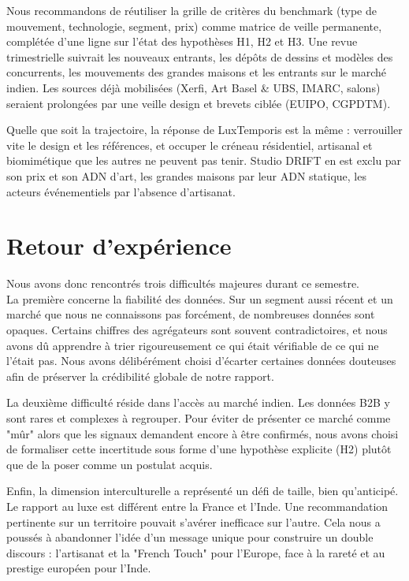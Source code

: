 \documentclass[11pt,a4paper]{article}
\begin{document}
Nous recommandons de réutiliser la grille de critères du benchmark (type de mouvement, technologie, segment, prix) comme matrice de veille permanente, complétée d'une ligne sur l'état des hypothèses H1, H2 et H3. Une revue trimestrielle suivrait les nouveaux entrants, les dépôts de dessins et modèles des concurrents, les mouvements des grandes maisons et les entrants sur le marché indien. Les sources déjà mobilisées (Xerfi, Art Basel \& UBS, IMARC, salons) seraient prolongées par une veille design et brevets ciblée (EUIPO, CGPDTM).

Quelle que soit la trajectoire, la réponse de LuxTemporis est la même : verrouiller vite le design et les références, et occuper le créneau résidentiel, artisanal et biomimétique que les autres ne peuvent pas tenir. Studio DRIFT en est exclu par son prix et son ADN d'art, les grandes maisons par leur ADN statique, les acteurs événementiels par l'absence d'artisanat.

\newpage 
\section{Retour d'expérience}

Nous avons donc rencontrés trois difficultés majeures durant ce semestre. \\ 

La première concerne la fiabilité des données. Sur un segment aussi récent et un marché que nous ne connaissons pas forcément, de nombreuses données sont opaques. Certains chiffres des agrégateurs sont souvent contradictoires, et nous avons dû apprendre à trier rigoureusement ce qui était vérifiable de ce qui ne l'était pas. Nous avons délibérément choisi d'écarter certaines données douteuses afin de préserver la crédibilité globale de notre rapport.

La deuxième difficulté réside dans l'accès au marché indien. Les données B2B y sont rares et complexes à regrouper. Pour éviter de présenter ce marché comme "mûr" alors que les signaux demandent encore à être confirmés, nous avons choisi de formaliser cette incertitude sous forme d'une hypothèse explicite (H2) plutôt que de la poser comme un postulat acquis.

Enfin, la dimension interculturelle a représenté un défi de taille, bien qu'anticipé. Le rapport au luxe est différent entre la France et l'Inde. Une recommandation pertinente sur un territoire pouvait s'avérer inefficace sur l'autre. Cela nous a poussés à abandonner l'idée d'un message unique pour construire un double discours : l'artisanat et la "French Touch" pour l'Europe, face à la rareté et au prestige européen pour l'Inde. \\
\end{document}
